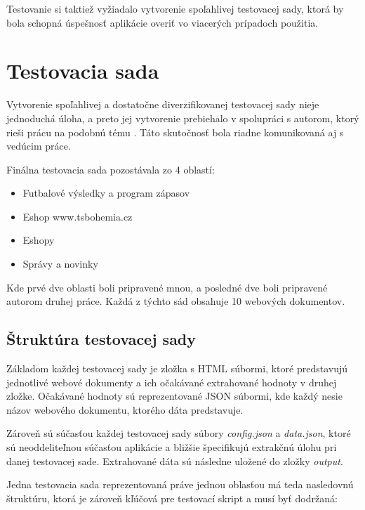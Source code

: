 Testovanie si taktiež vyžiadalo vytvorenie spoľahlivej testovacej sady, ktorá by bola schopná úspešnosť aplikácie overiť vo viacerých prípadoch použitia. 

\section{Testovacia sada}
\label{dataset}

Vytvorenie spoľahlivej a dostatočne diverzifikovanej testovacej sady nieje jednoduchá úloha, a preto jej vytvorenie prebiehalo v spolupráci s autorom, ktorý rieši prácu na podobnú tému \cite{mastera}. Táto skutočnosť bola riadne komunikovaná aj s vedúcim práce.

Finálna testovacia sada pozostávala zo 4 oblastí:

\begin{itemize}
    \item Futbalové výsledky a program zápasov
    \item Eshop www.tsbohemia.cz
    \item Eshopy
    \item Správy a novinky
\end{itemize}

Kde prvé dve oblasti boli pripravené mnou, a posledné dve boli pripravené autorom druhej práce. Každá z týchto sád obsahuje 10 webových dokumentov.

\subsection{Štruktúra testovacej sady}

Základom každej testovacej sady je zložka s HTML súbormi, ktoré predstavujú jednotlivé webové dokumenty a ich očakávané extrahované hodnoty v druhej zložke. Očakávané hodnoty sú reprezentované JSON súbormi, kde každý nesie názov webového dokumentu, ktorého dáta predstavuje. 

Zároveň sú súčasťou každej testovacej sady súbory \textit{config.json} a \textit{data.json}, ktoré sú neoddeliteľnou súčasťou aplikácie a bližšie špecifikujú extrakčnú úlohu pri danej testovacej sade. Extrahované dáta sú následne uložené do zložky \textit{output}.

Jedna testovacia sada reprezentovaná práve jednou oblasťou má teda nasledovnú štruktúru, ktorá je zároveň kľúčová pre testovací skript a musí byť dodržaná:

\bigskip


